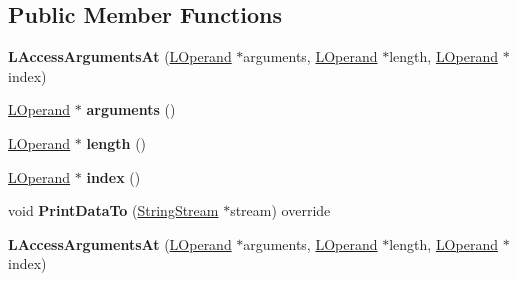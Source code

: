 \subsection*{Public Member Functions}
\begin{DoxyCompactItemize}
\item 
{\bfseries L\+Access\+Arguments\+At} (\hyperlink{classv8_1_1internal_1_1_l_operand}{L\+Operand} $\ast$arguments, \hyperlink{classv8_1_1internal_1_1_l_operand}{L\+Operand} $\ast$length, \hyperlink{classv8_1_1internal_1_1_l_operand}{L\+Operand} $\ast$index)\hypertarget{classv8_1_1internal_1_1_l_access_arguments_at_a8b3a736e564c8f5337bf40bebffae277}{}\label{classv8_1_1internal_1_1_l_access_arguments_at_a8b3a736e564c8f5337bf40bebffae277}

\item 
\hyperlink{classv8_1_1internal_1_1_l_operand}{L\+Operand} $\ast$ {\bfseries arguments} ()\hypertarget{classv8_1_1internal_1_1_l_access_arguments_at_a54eb42639fc35df69b3a3f57d7042ffd}{}\label{classv8_1_1internal_1_1_l_access_arguments_at_a54eb42639fc35df69b3a3f57d7042ffd}

\item 
\hyperlink{classv8_1_1internal_1_1_l_operand}{L\+Operand} $\ast$ {\bfseries length} ()\hypertarget{classv8_1_1internal_1_1_l_access_arguments_at_aca767dd582bd23265453d015e4cb3174}{}\label{classv8_1_1internal_1_1_l_access_arguments_at_aca767dd582bd23265453d015e4cb3174}

\item 
\hyperlink{classv8_1_1internal_1_1_l_operand}{L\+Operand} $\ast$ {\bfseries index} ()\hypertarget{classv8_1_1internal_1_1_l_access_arguments_at_a6d772ab178a18a50a3fa64dee0cab4c7}{}\label{classv8_1_1internal_1_1_l_access_arguments_at_a6d772ab178a18a50a3fa64dee0cab4c7}

\item 
void {\bfseries Print\+Data\+To} (\hyperlink{classv8_1_1internal_1_1_string_stream}{String\+Stream} $\ast$stream) override\hypertarget{classv8_1_1internal_1_1_l_access_arguments_at_a3027cb02e655a31d8f9264d10b49c7be}{}\label{classv8_1_1internal_1_1_l_access_arguments_at_a3027cb02e655a31d8f9264d10b49c7be}

\item 
{\bfseries L\+Access\+Arguments\+At} (\hyperlink{classv8_1_1internal_1_1_l_operand}{L\+Operand} $\ast$arguments, \hyperlink{classv8_1_1internal_1_1_l_operand}{L\+Operand} $\ast$length, \hyperlink{classv8_1_1internal_1_1_l_operand}{L\+Operand} $\ast$index)\hypertarget{classv8_1_1internal_1_1_l_access_arguments_at_a8b3a736e564c8f5337bf40bebffae277}{}\label{classv8_1_1internal_1_1_l_access_arguments_at_a8b3a736e564c8f5337bf40bebffae277}


\end{DoxyCompactItemize}

